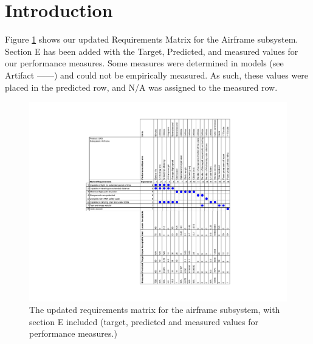 \documentclass[]{auvsi_doc}
\begin{document}
\begin{AUVSITitlePage}
\begin{artifacttable}
\end{artifacttable}
\end{AUVSITitlePage}

\section{Introduction}
Figure \ref{fig:reqmatrix} shows our updated Requirements Matrix for the Airframe subsystem. Section E has been added with the Target, Predicted, and measured values for our performance measures. Some measures were determined in models (see Artifact ------) and could not be empirically measured. As such, these values were placed in the predicted row, and N/A was assigned to the measured row.


\begin{figure}[h!]
	\includegraphics[width=1.2\columnwidth]{reqmatrix.pdf}
	\caption{The updated requirements matrix for the airframe subsystem, with section E included (target, predicted and measured values for performance measures.)}
	\label{fig:reqmatrix}
\end{figure}
\end{document}
